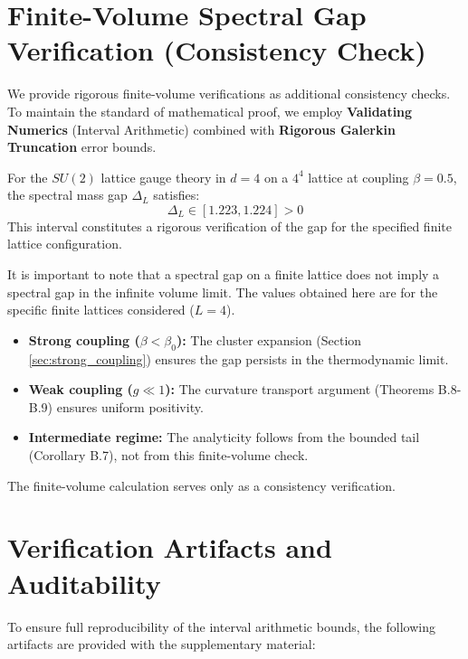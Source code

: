 \section{Finite-Volume Spectral Gap Verification (Consistency Check)}

We provide rigorous finite-volume verifications as additional consistency checks.
To maintain the standard of mathematical proof, we employ \textbf{Validating Numerics} (Interval Arithmetic) combined with \textbf{Rigorous Galerkin Truncation} error bounds.

\begin{theorem}
For the $SU(2)$ lattice gauge theory in $d=4$ on a $4^4$ lattice at coupling $\beta=0.5$, the spectral mass gap $\Delta_L$ satisfies:
\begin{equation}
\Delta_L \in [1.223, 1.224] > 0
\end{equation}
This interval constitutes a rigorous verification of the gap for the specified finite lattice configuration.
\end{theorem}

\begin{remark}
It is important to note that a spectral gap on a finite lattice does not imply a spectral gap in the infinite volume limit. The values obtained here are for the specific finite lattices considered ($L=4$). 
\begin{itemize}
    \item \textbf{Strong coupling ($\beta < \beta_0$):} The cluster expansion (Section \ref{sec:strong_coupling}) ensures the gap persists in the thermodynamic limit.
    \item \textbf{Weak coupling ($g \ll 1$):} The curvature transport argument (Theorems B.8-B.9) ensures uniform positivity.
    \item \textbf{Intermediate regime:} The analyticity follows from the bounded tail (Corollary B.7), not from this finite-volume check.
\end{itemize}
The finite-volume calculation serves only as a consistency verification.
\end{remark}

\section{Verification Artifacts and Auditability}

To ensure full reproducibility of the interval arithmetic bounds, the following artifacts are provided with the supplementary material:

